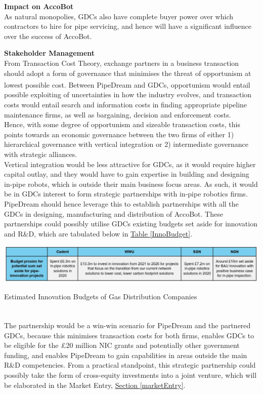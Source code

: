 \documentclass[11pt]{article}		%
\newcommand{\supercite}[1]{\textsuperscript{\cite{#1}}}		%
\newcommand{\tableref}[1]{\hyperref[#1]{Table \ref*{#1}}}     %
\newcommand{\sectref}[1]{\hyperref[#1]{Section \ref*{#1}}}     %
\begin{document}
        \textbf{Impact on AccoBot}
        \\
        As natural monopolies, GDCs also have complete buyer power over which contractors to hire for pipe servicing, and hence will have a significant influence over the success of AccoBot. 
        
        \textbf{Stakeholder Management}
        \\
	    From Transaction Cost Theory, exchange partners in a business transaction should adopt a form of governance that minimises the threat of opportunism at lowest possible cost\supercite{transaction}. Between PipeDream and GDCs, opportunism would entail possible exploiting of uncertainties in how the industry evolves, and transaction costs would entail search and information costs in finding appropriate pipeline maintenance firms, as well as bargaining, decision and enforcement costs. 
         \\ 
         \hspace*{2ex}Hence, with some degree of opportunism and sizeable transaction costs, this points towards an economic governance between the two firms of either 1) hierarchical governance with vertical integration or 2) intermediate governance with strategic alliances. 
         \\ 
         \hspace*{2ex}Vertical integration would be less attractive for GDCs, as it would require higher capital outlay, and they would have to gain expertise in building and designing in-pipe robots, which is outside their main business focus areas. As such, it would be in GDCs interest to form strategic partnerships with in-pipe robotics firms. 
         \\ 
         \hspace*{2ex}PipeDream should hence leverage this to establish partnerships with all the GDCs in designing, manufacturing and distribution of AccoBot. These partnerships could possibly utilise GDCs existing budgets set aside for innovation and R\&D, which are tabulated below in \tableref{InnoBudget}. 
        \begin{table}[h]
					\centering
					\includegraphics[width=\textwidth]{InnoBudget.jpg}
					\caption{Estimated Innovation Budgets of Gas Distribution Companies}
					\label{InnoBudget}
				\end{table}
		\\
        \hspace*{2ex}The partnership would be a win-win scenario\supercite{winwin} for PipeDream and the partnered GDCs, because this minimises transaction costs for both firms, enables GDCs to be eligible for the £20 million NIC grants and potentially other government funding, and enables PipeDream to gain capabilities in areas outside the main R\&D competencies. From a practical standpoint, this strategic partnership could possibly take the form of cross-equity investments into a joint venture, which will be elaborated in the Market Entry, \sectref{marketEntry}.
		
\end{document}
